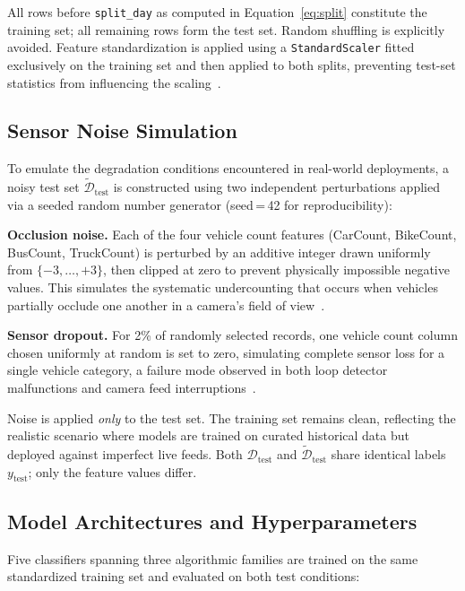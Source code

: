 \documentclass[conference,onecolumn,12pt]{IEEEtran}
\begin{document}
All rows before \texttt{split\_day} as computed in
Equation~\eqref{eq:split} constitute the training set; all remaining
rows form the test set. Random shuffling is explicitly avoided. Feature
standardization is applied using a \texttt{StandardScaler} fitted exclusively
on the training set and then applied to both splits, preventing test-set
statistics from influencing the scaling~\cite{mcelfresh2023}.

\subsection{Sensor Noise Simulation}

To emulate the degradation conditions encountered in real-world deployments, a
noisy test set $\tilde{\mathcal{D}}_{\text{test}}$ is constructed using two
independent perturbations applied via a seeded random number generator
(seed\,=\,42 for reproducibility):

\textbf{Occlusion noise.} Each of the four vehicle count features
(CarCount, BikeCount, BusCount, TruckCount) is perturbed by an additive
integer drawn uniformly from $\{-3,\ldots,+3\}$, then clipped at zero to
prevent physically impossible negative values. This simulates the systematic
undercounting that occurs when vehicles partially occlude one another in a
camera's field of view~\cite{xie2024,liu2024}.

\textbf{Sensor dropout.} For 2\% of randomly selected records, one vehicle
count column chosen uniformly at random is set to zero, simulating complete
sensor loss for a single vehicle category, a failure mode observed in both
loop detector malfunctions and camera feed interruptions~\cite{xie2024}.

Noise is applied \emph{only} to the test set. The training set remains clean,
reflecting the realistic scenario where models are trained on curated
historical data but deployed against imperfect live feeds. Both
$\mathcal{D}_{\text{test}}$ and $\tilde{\mathcal{D}}_{\text{test}}$ share
identical labels $y_{\text{test}}$; only the feature values differ.

\subsection{Model Architectures and Hyperparameters}

Five classifiers spanning three algorithmic families are trained on the same
standardized training set and evaluated on both test conditions:
\end{document}
